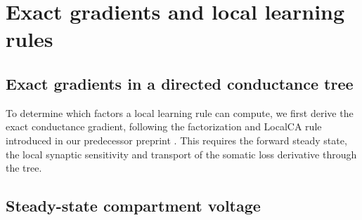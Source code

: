 \section{Exact gradients and local learning rules}
\label{note:exact_rules}

\subsection{Exact gradients in a directed conductance tree}
\label{note:derivation}

To determine which factors a local learning rule can compute, we first derive
the exact conductance gradient, following the factorization and LocalCA rule introduced in our predecessor preprint \citep{safaai2026localcredit}. This requires the forward steady state, the
local synaptic sensitivity and transport of the somatic loss derivative
through the tree.

\subsection{Steady-state compartment voltage}

